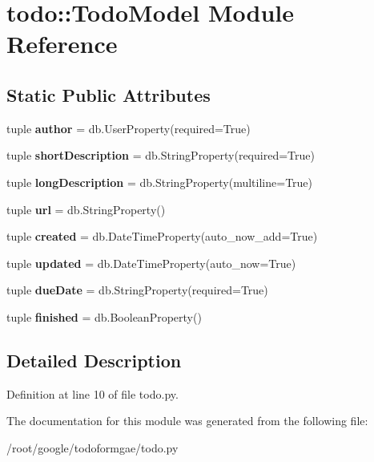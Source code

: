 \hypertarget{moduletodo_1_1_todo_model}{
\section{todo::TodoModel Module Reference}
\label{moduletodo_1_1_todo_model}
}
\subsection*{Static Public Attributes}
\begin{DoxyCompactItemize}
\item 
\hypertarget{moduletodo_1_1_todo_model_a6bee89e4e6566a3e2e752905d6bc1678}{
tuple {\bfseries author} = db.UserProperty(required=True)}
\label{moduletodo_1_1_todo_model_a6bee89e4e6566a3e2e752905d6bc1678}

\item 
\hypertarget{moduletodo_1_1_todo_model_a16fa063d7ba31dd50a24227b38bc867a}{
tuple {\bfseries shortDescription} = db.StringProperty(required=True)}
\label{moduletodo_1_1_todo_model_a16fa063d7ba31dd50a24227b38bc867a}

\item 
\hypertarget{moduletodo_1_1_todo_model_a4ab34a045cabbe405ff1e901678fbcb7}{
tuple {\bfseries longDescription} = db.StringProperty(multiline=True)}
\label{moduletodo_1_1_todo_model_a4ab34a045cabbe405ff1e901678fbcb7}

\item 
\hypertarget{moduletodo_1_1_todo_model_a9bd80624c9dc03a24e437f5e785d90da}{
tuple {\bfseries url} = db.StringProperty()}
\label{moduletodo_1_1_todo_model_a9bd80624c9dc03a24e437f5e785d90da}

\item 
\hypertarget{moduletodo_1_1_todo_model_acc5a3482db5a51e3ca54809ac84d340a}{
tuple {\bfseries created} = db.DateTimeProperty(auto\_\-now\_\-add=True)}
\label{moduletodo_1_1_todo_model_acc5a3482db5a51e3ca54809ac84d340a}

\item 
\hypertarget{moduletodo_1_1_todo_model_a33b1394caead5d4302c3d22a305f7f78}{
tuple {\bfseries updated} = db.DateTimeProperty(auto\_\-now=True)}
\label{moduletodo_1_1_todo_model_a33b1394caead5d4302c3d22a305f7f78}

\item 
\hypertarget{moduletodo_1_1_todo_model_aa14e63a38ee329f6a46378d7c79f1da7}{
tuple {\bfseries dueDate} = db.StringProperty(required=True)}
\label{moduletodo_1_1_todo_model_aa14e63a38ee329f6a46378d7c79f1da7}

\item 
\hypertarget{moduletodo_1_1_todo_model_a5aefed8ce54a4d8b171bd8eba6c745ab}{
tuple {\bfseries finished} = db.BooleanProperty()}
\label{moduletodo_1_1_todo_model_a5aefed8ce54a4d8b171bd8eba6c745ab}

\end{DoxyCompactItemize}


\subsection{Detailed Description}


Definition at line 10 of file todo.py.

The documentation for this module was generated from the following file:\begin{DoxyCompactItemize}
\item 
/root/google/todoformgae/todo.py\end{DoxyCompactItemize}
